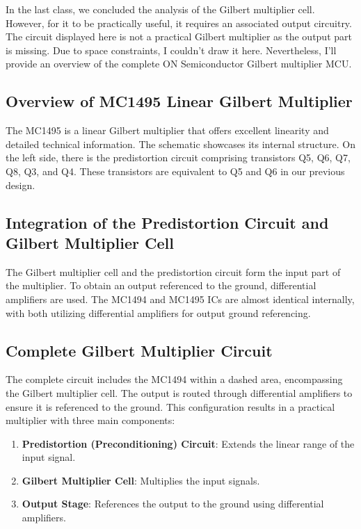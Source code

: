 In the last class, we concluded the analysis of the Gilbert multiplier cell. However, for it to be practically useful, it requires an associated output circuitry. The circuit displayed here is not a practical Gilbert multiplier as the output part is missing. Due to space constraints, I couldn't draw it here. Nevertheless, I'll provide an overview of the complete ON Semiconductor Gilbert multiplier MCU.

\subsection{Overview of MC1495 Linear Gilbert Multiplier}

The MC1495 is a linear Gilbert multiplier that offers excellent linearity and detailed technical information. The schematic showcases its internal structure. On the left side, there is the predistortion circuit comprising transistors Q5, Q6, Q7, Q8, Q3, and Q4. These transistors are equivalent to Q5 and Q6 in our previous design.

\subsection{Integration of the Predistortion Circuit and Gilbert Multiplier Cell}

The Gilbert multiplier cell and the predistortion circuit form the input part of the multiplier. To obtain an output referenced to the ground, differential amplifiers are used. The MC1494 and MC1495 ICs are almost identical internally, with both utilizing differential amplifiers for output ground referencing.

\subsection{Complete Gilbert Multiplier Circuit}

The complete circuit includes the MC1494 within a dashed area, encompassing the Gilbert multiplier cell. The output is routed through differential amplifiers to ensure it is referenced to the ground. This configuration results in a practical multiplier with three main components:
\begin{enumerate}
    \item \textbf{Predistortion (Preconditioning) Circuit}: Extends the linear range of the input signal.
    \item \textbf{Gilbert Multiplier Cell}: Multiplies the input signals.
    \item \textbf{Output Stage}: References the output to the ground using differential amplifiers.
\end{enumerate}

